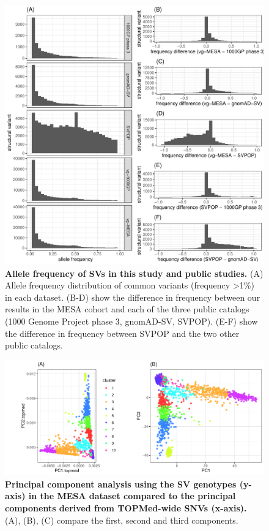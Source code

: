 \documentclass[11pt]{ucscthesis}
\begin{document}
\begin{figure}[H]
  \includegraphics[width=\linewidth]{fig-sv-freq-comp.pdf}
  \caption[Allele frequency of SVs in this study and public studies]{{\bf Allele frequency of SVs in this study and public studies.}
    (A) Allele frequency distribution of common variants (frequency >1\%) in each dataset.
    (B-D) show the difference in frequency between our results in the MESA cohort and each of the three public catalogs (1000 Genome Project phase 3, gnomAD-SV, SVPOP).
    (E-F) show the difference in frequency between SVPOP and the two other public catalogs.}
  \label{fig:sv-freq-comp}
\end{figure}

\begin{figure}[H]
  \includegraphics[width=\linewidth, page=3]{fig-sv-mesa-pcs.pdf}
  \caption[Principal component analysis using the SV genotypes or SNVs in the MESA dataset]{{\bf Principal component analysis using the SV genotypes (y-axis) in the MESA dataset compared to the principal components derived from TOPMed-wide SNVs (x-axis).}
    (A), (B), (C) compare the first, second and third components.}
  \label{fig:mesa-topmed-pcs}
\end{figure}
\end{document}
